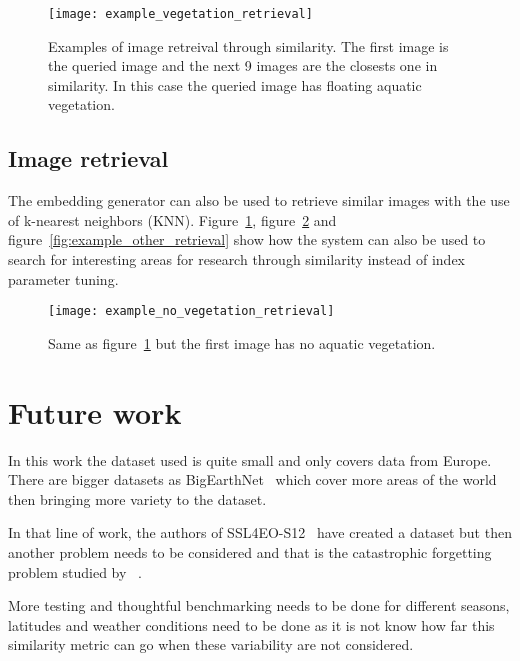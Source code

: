 \documentclass[conference]{IEEEtran}
\begin{document}
    \begin{figure}[t]
        \centering
        \texttt{[image: example\_vegetation\_retrieval]}
        \caption{Examples of image retreival through similarity. The first image is the queried image and the next 9 images are the closests one in similarity.
        In this case the queried image has floating aquatic vegetation.}
        \label{fig:example_vegetation_retrieval}
    \end{figure}

    \subsection{Image retrieval}
    The embedding generator can also be used to retrieve similar images with the use of k-nearest neighbors (KNN).
    Figure~\ref{fig:example_vegetation_retrieval}, figure~\ref{fig:example_no_vegetation_retrieval} and figure~\ref{fig:example_other_retrieval} show how the system can also
    be used to search for interesting areas for research through similarity instead of index parameter tuning.



    \begin{figure}[t]
        \centering
        \texttt{[image: example\_no\_vegetation\_retrieval]}
        \caption{Same as figure~\ref{fig:example_vegetation_retrieval} but the first image has no aquatic vegetation.}
        \label{fig:example_no_vegetation_retrieval}
    \end{figure}


    \section{Future work}
    In this work the dataset used is quite small and only covers data from Europe.
    There are bigger datasets as BigEarthNet~\cite{bigearthnet} which cover more areas of the world then bringing more variety to the dataset.

    In that line of work, the authors of SSL4EO-S12~\cite{wang2023ssl4eos12} have created a dataset but then another problem needs to be considered
    and that is the catastrophic forgetting problem studied by ~\citet{kirkpatrick2017overcoming, de2021continual, 10135093, purushwalkam2022challenges}.

    More testing and thoughtful benchmarking needs to be done for different seasons, latitudes and weather conditions need to be done as it is not know
    how far this similarity metric can go when these variability are not considered.
\end{document}
